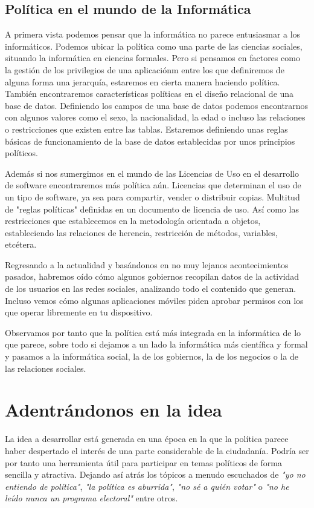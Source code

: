 \subsection{Política en el mundo de la Informática}

A primera vista podemos pensar que la informática no parece entusiasmar a los informáticos. Podemos ubicar la política como una parte de las ciencias sociales, situando la informática en ciencias formales. Pero si pensamos en factores como la gestión de los privilegios de una aplicaciónm entre los que definiremos de alguna forma una jerarquía, estaremos en cierta manera haciendo política. También encontraremos características políticas en el diseño relacional de una base de datos. Definiendo los campos de una base de datos podemos encontrarnos con algunos valores como el sexo, la nacionalidad, la edad o incluso las relaciones o restricciones que existen entre las tablas. Estaremos definiendo unas reglas básicas de funcionamiento de la base de datos establecidas por unos principios políticos.

Además si nos sumergimos en el mundo de las Licencias de Uso en el desarrollo de software encontraremos más política aún. Licencias que determinan el uso de un tipo de software, ya sea para compartir, vender o distribuir copias. Multitud de "reglas políticas" definidas en un documento de licencia de uso. Así como las restricciones que establecemos en la metodología orientada a objetos, estableciendo las relaciones de herencia, restricción de métodos, variables, etcétera.

Regresando a la actualidad y basándonos en no muy lejanos acontecimientos pasados, habremos oído cómo algunos gobiernos recopilan datos de la actividad de los usuarios en las redes sociales, analizando todo el contenido que generan. Incluso vemos cómo algunas aplicaciones móviles piden aprobar permisos con los que operar libremente en tu dispositivo.

Observamos por tanto que la política está más integrada en la informática de lo que parece, sobre todo si dejamos a un lado la informática más científica y formal y pasamos a la informática social, la de los gobiernos, la de los negocios o la de las relaciones sociales.


\section{Adentrándonos en la idea}

La idea a desarrollar está generada en una época en la que la política parece haber despertado el interés de una parte considerable de la ciudadanía. Podría ser por tanto una herramienta útil para participar en temas políticos de forma sencilla y atractiva. Dejando así atrás los tópicos a menudo escuchados de \textit{"yo no entiendo de política"}, \textit{"la política es aburrida"}, \textit{"no sé a quién votar"} o \textit{"no he leído nunca un programa electoral"} entre otros.

